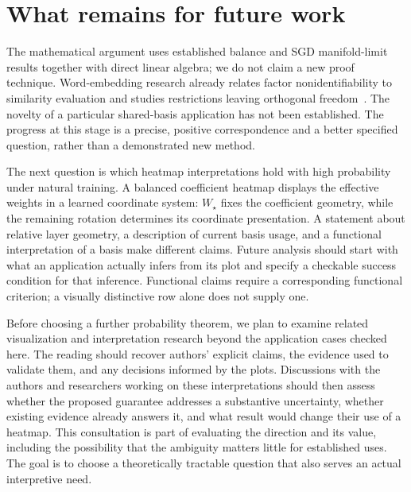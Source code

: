 \section{What remains for future work}
The mathematical argument uses established balance and SGD manifold-limit results together with direct linear algebra; we do not claim a new proof technique. Word-embedding research already relates factor nonidentifiability to similarity evaluation and studies restrictions leaving orthogonal freedom~\cite{word}. The novelty of a particular shared-basis application has not been established. The progress at this stage is a precise, positive correspondence and a better specified question, rather than a demonstrated new method.

The next question is which heatmap interpretations hold with high probability under natural training. A balanced coefficient heatmap displays the effective weights in a learned coordinate system: $W_\star$ fixes the coefficient geometry, while the remaining rotation determines its coordinate presentation. A statement about relative layer geometry, a description of current basis usage, and a functional interpretation of a basis make different claims. Future analysis should start with what an application actually infers from its plot and specify a checkable success condition for that inference. Functional claims require a corresponding functional criterion; a visually distinctive row alone does not supply one.

Before choosing a further probability theorem, we plan to examine related visualization and interpretation research beyond the application cases checked here. The reading should recover authors' explicit claims, the evidence used to validate them, and any decisions informed by the plots. Discussions with the authors and researchers working on these interpretations should then assess whether the proposed guarantee addresses a substantive uncertainty, whether existing evidence already answers it, and what result would change their use of a heatmap. This consultation is part of evaluating the direction and its value, including the possibility that the ambiguity matters little for established uses. The goal is to choose a theoretically tractable question that also serves an actual interpretive need.

